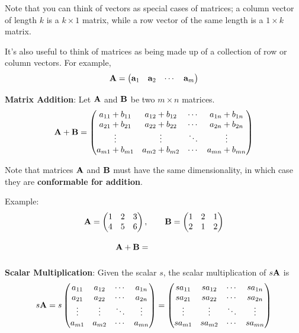 \documentclass[]{book}
\theoremstyle{definition}
\theoremstyle{definition}
\theoremstyle{definition}
\theoremstyle{remark}
\begin{document}
Note that you can think of vectors as special cases of matrices; a
column vector of length \(k\) is a \(k \times 1\) matrix, while a row
vector of the same length is a \(1 \times k\) matrix.

It's also useful to think of matrices as being made up of a collection
of row or column vectors. For example,
\[\bf A = \begin{pmatrix} {\bf a}_1 & {\bf a}_2 &  \cdots & {\bf a}_m \end{pmatrix}\]

\textbf{Matrix Addition}: Let \(\bf A\) and \(\bf B\) be two
\(m\times n\) matrices. \[{\bf A+B}=\begin{pmatrix}
            a_{11}+b_{11} & a_{12}+b_{12} & \cdots & a_{1n}+b_{1n} \\
            a_{21}+b_{21} & a_{22}+b_{22} & \cdots & a_{2n}+b_{2n} \\
            \vdots & \vdots  & \ddots & \vdots \\
            a_{m1}+b_{m1} & a_{m2}+b_{m2} & \cdots & a_{mn}+b_{mn}
        \end{pmatrix}\]

Note that matrices \({\bf A}\) and \({\bf B}\) must have the same
dimensionality, in which case they are \textbf{conformable for
addition}.

Example:
\[{\bf A}=\begin{pmatrix} 1 & 2 & 3 \\ 4 & 5 & 6 \end{pmatrix}, \qquad
            {\bf B}=\begin{pmatrix} 1 & 2 & 1 \\ 2 & 1 & 2 \end{pmatrix}\]
\[{\bf A+B}= \phantom{\begin{pmatrix} 2 & 4 & 4 \\ 6 & 6 & 8 \end{pmatrix}}\]

\textbf{Scalar Multiplication}: Given the scalar \(s\), the scalar
multiplication of \(s {\bf A}\) is \[ s {\bf A}=  s \begin{pmatrix}
            a_{11} & a_{12} & \cdots & a_{1n} \\
            a_{21} & a_{22} & \cdots & a_{2n} \\
            \vdots & \vdots & \ddots & \vdots \\
            a_{m1} & a_{m2} & \cdots & a_{mn}
        \end{pmatrix}
        = \begin{pmatrix}
            s a_{11} & s a_{12} & \cdots & s a_{1n} \\
            s a_{21} & s a_{22} & \cdots & s a_{2n} \\
            \vdots & \vdots & \ddots & \vdots \\
            s a_{m1} & s a_{m2} & \cdots & s a_{mn}
        \end{pmatrix}\]
\end{document}
